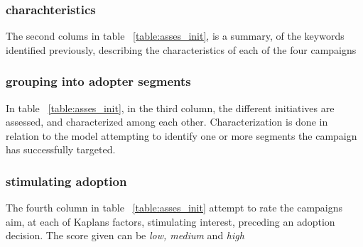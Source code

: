 \documentclass[journal]{IEEEtran}
\begin{document}
\subsubsection{charachteristics}
The second colums in table ~\ref{table:asses_init}, is a summary, of the keywords identified previously, describing the characteristics of each of the four campaigns

\subsubsection{grouping into adopter segments}
In table ~\ref{table:asses_init}, in the third column, the different initiatives are assessed, and characterized among each other. Characterization is done in relation to the model attempting to identify one or more segments the campaign has successfully targeted. 

\subsubsection{stimulating adoption}
The fourth column in table ~\ref{table:asses_init} attempt to rate the campaigns aim, at each of Kaplans factors, stimulating interest, preceding an adoption decision. The score given can be \textit{low, medium} and \textit{high}
\end{document}
